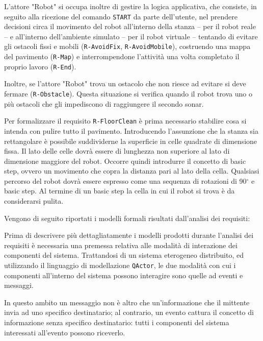 \documentclass{llncs}
\newcommand{\action}[1]{\texttt{#1}\xspace}
\newcommand{\code}[1]{{\color{blue}\small{\texttt{#1}}}}
\begin{document}
L'attore "Robot" si occupa inoltre di gestire la logica applicativa, che consiste, in seguito alla ricezione del comando \action{START} da parte dell'utente, nel prendere decisioni circa il movimento del robot all'interno della stanza – per il robot reale – e all'interno dell'ambiente simulato – per il robot virtuale – tentando di evitare gli ostacoli fissi e mobili (\code{R-AvoidFix}, \code{R-AvoidMobile}), costruendo una mappa del pavimento (\code{R-Map}) e interrompendone l'attività una volta completato il proprio lavoro (\code{R-End}).

Inoltre, se l'attore "Robot" trova un ostacolo che non riesce ad evitare si deve fermare (\code{R-Obstacle}).
Questa situazione si verifica quando il robot trova uno o più ostacoli che gli impediscono di raggiungere il secondo sonar.

Per formalizzare il requisito \code{R-FloorClean} è prima necessario stabilire cosa si intenda con pulire tutto il pavimento. Introducendo l'assunzione che la stanza sia rettangolare è possibile suddividerne la superficie in celle quadrate di dimensione fissa. Il lato delle celle dovrà essere di lunghezza non superiore al lato di dimensione maggiore del robot. Occorre quindi introdurre il concetto di basic step, ovvero un movimento che copra la distanza pari al lato della cella. Qualsiasi percorso del robot dovrà essere espresso come una sequenza di rotazioni di 90$^{\circ}$ e basic step. Al termine di un basic step la cella in cui il robot si trova è da considerarsi pulita. 

Vengono di seguito riportati i modelli formali risultati dall'analisi dei requisiti:




Prima di descrivere più dettagliatamente i modelli prodotti durante l'analisi dei requisiti è necessaria una premessa relativa alle modalità di interazione dei componenti del sistema. Trattandosi di un sistema eterogeneo distribuito, ed utilizzando il linguaggio di modellazione \action{QActor}, le due modalità con cui i componenti all'interno del sistema possono interagire sono quelle ad eventi e messaggi. 

In questo ambito un messaggio non è altro che un'informazione che il mittente invia ad uno specifico destinatario; al contrario, un evento cattura il concetto di informazione senza specifico destinatario: tutti i componenti del sistema interessati all'evento possono riceverlo. \\
\end{document}
